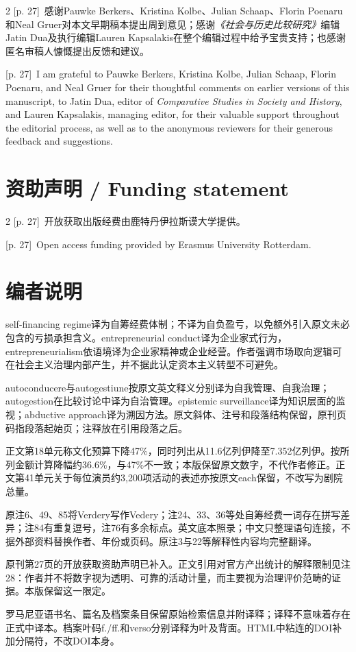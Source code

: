 \documentclass[10pt,a4paper]{article}
\begin{document}
\begin{paracol}{2}
{\scriptsize\color{gray} [p. 27]}\ 感谢Pauwke Berkers、Kristina Kolbe、Julian Schaap、Florin Poenaru和Neal Gruer对本文早期稿本提出周到意见；感谢\textit{《社会与历史比较研究》}编辑Jatin Dua及执行编辑Lauren Kapsalakis在整个编辑过程中给予宝贵支持；也感谢匿名审稿人慷慨提出反馈和建议。\par
\switchcolumn
{\scriptsize\color{gray} [p. 27]}\ I am grateful to Pauwke Berkers, Kristina Kolbe, Julian Schaap, Florin Poenaru, and Neal Gruer for their thoughtful comments on earlier versions of this manuscript, to Jatin Dua, editor of \textit{Comparative Studies in Society and History}, and Lauren Kapsalakis, managing editor, for their valuable support throughout the editorial process, as well as to the anonymous reviewers for their generous feedback and suggestions.\par
\switchcolumn*
\end{paracol}
\section*{资助声明 / Funding statement}
\begin{paracol}{2}
{\scriptsize\color{gray} [p. 27]}\ 开放获取出版经费由鹿特丹伊拉斯谟大学提供。\par
\switchcolumn
{\scriptsize\color{gray} [p. 27]}\ Open access funding provided by Erasmus University Rotterdam.\par
\switchcolumn*
\end{paracol}
\section*{编者说明}{\small
self-financing regime译为自筹经费体制；不译为自负盈亏，以免额外引入原文未必包含的亏损承担含义。entrepreneurial conduct译为企业家式行为，entrepreneurialism依语境译为企业家精神或企业经营。作者强调市场取向逻辑可在社会主义治理内部产生，并不据此认定资本主义转型不可避免。\par
autoconducere与autogestiune按原文英文释义分别译为自我管理、自我治理；autogestion在比较讨论中译为自治管理。epistemic surveillance译为知识层面的监视；abductive approach译为溯因方法。原文斜体、注号和段落结构保留，原刊页码指段落起始页；注释放在引用段落之后。\par
正文第18单元称文化预算下降47\%，同时列出从11.6亿列伊降至7.352亿列伊。按所列金额计算降幅约36.6\%，与47\%不一致；本版保留原文数字，不代作者修正。正文第41单元关于每位演员约3,200项活动的表述亦按原文each保留，不改写为剧院总量。\par
原注6、49、85将Verdery写作Vedery；注24、33、36等处自筹经费一词存在拼写差异；注84有重复逗号，注76有多余标点。英文底本照录；中文只整理语句连接，不据外部资料替换作者、年份或页码。原注3与22等解释性内容均完整翻译。\par
原刊第27页的开放获取资助声明已补入。正文引用对官方产出统计的解释限制见注28：作者并不将数字视为透明、可靠的活动计量，而主要视为治理评价范畴的证据。本版保留这一限定。\par
罗马尼亚语书名、篇名及档案条目保留原始检索信息并附译释；译释不意味着存在正式中译本。档案叶码f./ff.和verso分别译释为叶及背面。HTML中粘连的DOI补加分隔符，不改DOI本身。\par
}
\end{document}
